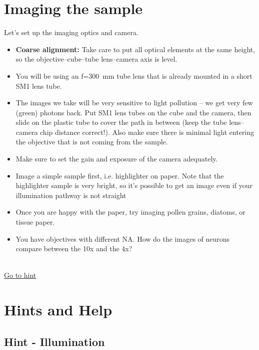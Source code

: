 \documentclass[a4paper]{report}
\begin{document}
\section{Imaging the sample}
Let's set up the imaging optics and camera.
   \begin{itemize}
       \item \textbf{Coarse alignment:} Take care to put all optical elements at the same height, so the objective--cube--tube lens--camera axis is level.
       \item You will be using an f=300~mm tube lens that is already mounted in a short SM1 lens tube.
       \item The images we take will be very sensitive to light pollution -- we get very few (green) photons back. Put SM1 lens tubes on the cube and the camera, then slide on the plastic tube to cover the path in between (keep the tube lens--camera chip distance correct!). Also make sure there is minimal light entering the objective that is not coming from the sample.
       \item Make sure to set the gain and exposure of the camera adequately.
       \item Image a simple sample first, i.e. highlighter on paper. Note that the highlighter sample is very bright, so it's possible to get an image even if your illumination pathway is not straight 
       \item Once you are happy with the paper, try imaging pollen grains, diatoms, or tissue paper.
       \item You have objectives with different NA. How do the images of neurons compare between the 10x and the 4x?
   \end{itemize}
\hypertarget{hintBack-imaging}{}
\\
\hyperlink{hintTo-imaging}{Go to hint}


\clearpage

\section{Hints and Help}
   \subsection{Hint - Illumination}
\hypertarget{hintTo-illumination}{}
\end{document}
